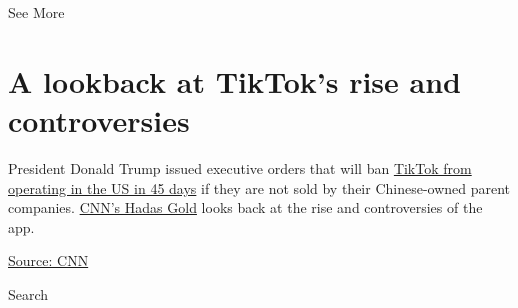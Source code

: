 See More

\hypertarget{a-lookback-at-tiktoks-rise-and-controversies-2}{%
\section{A lookback at TikTok's rise and
controversies}\label{a-lookback-at-tiktoks-rise-and-controversies-2}}

President Donald Trump issued executive orders that will ban
\href{https://edition.cnn.com/2020/08/06/politics/trump-executive-order-tiktok/index.html}{TikTok
from operating in the US in 45 days} if they are not sold by their
Chinese-owned parent companies.
\href{http://www.cnn.com/profiles/hadas-gold}{CNN's Hadas Gold} looks
back at the rise and controversies of the app.

\href{https://www.cnn.com/}{Source: CNN}

Search

